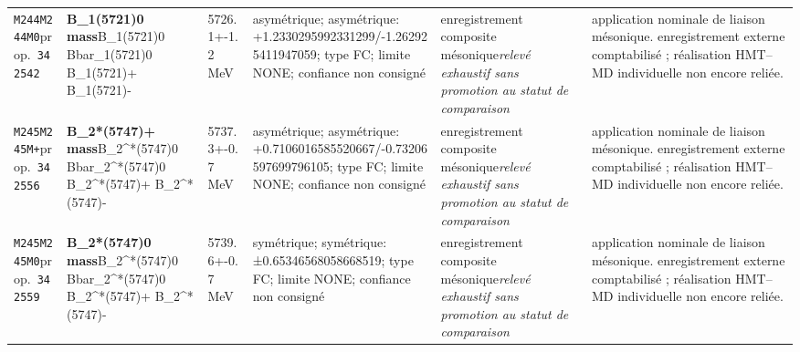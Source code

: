 \begin{landscape}
\begin{longtable}{L{1.85cm}L{4.45cm}L{2.35cm}L{4.05cm}L{3.35cm}L{7.15cm}}
\texttt{M244}\newline \texttt{M244M0}\newline prop.\ \texttt{342542} & \textbf{B\_\allowbreak{}1(5721)0 mass}\newline B\_\allowbreak{}1(5721)0 \textbar{}\allowbreak{} Bbar\_\allowbreak{}1(5721)0 \textbar{}\allowbreak{} B\_\allowbreak{}1(5721)+ \textbar{}\allowbreak{} B\_\allowbreak{}1(5721)- & 5726.1+-1.2\,MeV & asymétrique; asymétrique: +1.2330295992331299/-1.262925411947059; type FC; limite NONE; confiance non consigné & enregistrement composite mésonique\newline \emph{relevé exhaustif sans promotion au statut de comparaison} & application nominale de liaison mésonique. enregistrement externe comptabilisé ; réalisation HMT--MD individuelle non encore reliée. \\
\texttt{M245}\newline \texttt{M245M+}\newline prop.\ \texttt{342556} & \textbf{B\_\allowbreak{}2*(5747)+ mass}\newline B\_\allowbreak{}2\textasciicircum{}*(5747)0 \textbar{}\allowbreak{} Bbar\_\allowbreak{}2\textasciicircum{}*(5747)0 \textbar{}\allowbreak{} B\_\allowbreak{}2\textasciicircum{}*(5747)+ \textbar{}\allowbreak{} B\_\allowbreak{}2\textasciicircum{}*(5747)- & 5737.3+-0.7\,MeV & asymétrique; asymétrique: +0.7106016585520667/-0.73206597699796105; type FC; limite NONE; confiance non consigné & enregistrement composite mésonique\newline \emph{relevé exhaustif sans promotion au statut de comparaison} & application nominale de liaison mésonique. enregistrement externe comptabilisé ; réalisation HMT--MD individuelle non encore reliée. \\
\texttt{M245}\newline \texttt{M245M0}\newline prop.\ \texttt{342559} & \textbf{B\_\allowbreak{}2*(5747)0 mass}\newline B\_\allowbreak{}2\textasciicircum{}*(5747)0 \textbar{}\allowbreak{} Bbar\_\allowbreak{}2\textasciicircum{}*(5747)0 \textbar{}\allowbreak{} B\_\allowbreak{}2\textasciicircum{}*(5747)+ \textbar{}\allowbreak{} B\_\allowbreak{}2\textasciicircum{}*(5747)- & 5739.6+-0.7\,MeV & symétrique; symétrique: ±0.65346568058668519; type FC; limite NONE; confiance non consigné & enregistrement composite mésonique\newline \emph{relevé exhaustif sans promotion au statut de comparaison} & application nominale de liaison mésonique. enregistrement externe comptabilisé ; réalisation HMT--MD individuelle non encore reliée. \\

\end{longtable}
\end{landscape}

